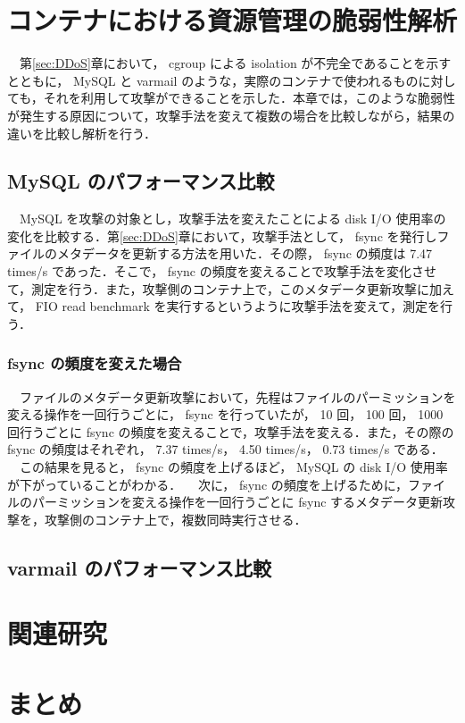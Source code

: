 \documentclass[graduation-thesis]{jsarticle}
\begin{document}
\clearpage
\section{コンテナにおける資源管理の脆弱性解析}
\label{sec:analysis}
　第\ref{sec:DDoS}章において， cgroup による isolation が不完全であることを示すとともに， MySQL と varmail のような，実際のコンテナで使われるものに対しても，それを利用して攻撃ができることを示した．本章では，このような脆弱性が発生する原因について，攻撃手法を変えて複数の場合を比較しながら，結果の違いを比較し解析を行う．\\

\subsection{MySQL のパフォーマンス比較}
　MySQL を攻撃の対象とし，攻撃手法を変えたことによる disk I/O 使用率の変化を比較する．第\ref{sec:DDoS}章において，攻撃手法として， fsync を発行しファイルのメタデータを更新する方法を用いた．その際， fsync の頻度は 7.47 times/s であった．そこで， fsync の頻度を変えることで攻撃手法を変化させて，測定を行う．また，攻撃側のコンテナ上で，このメタデータ更新攻撃に加えて， FIO read benchmark を実行するというように攻撃手法を変えて，測定を行う．\\
\subsubsection{fsync の頻度を変えた場合}
　ファイルのメタデータ更新攻撃において，先程はファイルのパーミッションを変える操作を一回行うごとに， fsync を行っていたが， 10 回， 100 回， 1000 回行うごとに fsync の頻度を変えることで，攻撃手法を変える．また，その際の fsync の頻度はそれぞれ， 7.37 times/s， 4.50 times/s， 0.73 times/s である．\\
　この結果を見ると， fsync の頻度を上げるほど， MySQL の disk I/O 使用率が下がっていることがわかる．
　次に， fsync の頻度を上げるために，ファイルのパーミッションを変える操作を一回行うごとに fsync するメタデータ更新攻撃を，攻撃側のコンテナ上で，複数同時実行させる．

\subsection{varmail のパフォーマンス比較}

\clearpage
\section{関連研究}
\label{sec:relative}

\clearpage
\section{まとめ}
\label{sec:conclusion}
\end{document}
